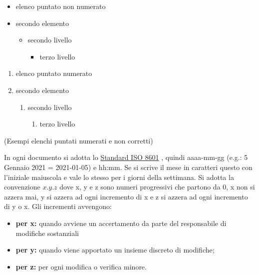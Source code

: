                 \begin{multicols}{2}
                    \begin{itemize}
                        \item elenco puntato non numerato
                        \item secondo elemento
                        \begin{itemize}
                            \item secondo livello
                            \begin{itemize}
                                \item terzo livello
                            \end{itemize}
                        \end{itemize}
                    \end{itemize}
                    \begin{enumerate}
                        \item elenco puntato numerato
                        \item secondo elemento
                        \begin{enumerate}
                            \item secondo livello
                            \begin{enumerate}
                                \item terzo livello
                            \end{enumerate}
                        \end{enumerate}
                    \end{enumerate}
                \end{multicols}
                \centerline{(Esempi elenchi puntati numerati e non corretti)}
                In ogni documento si adotta lo \href{https://www.iso.org/iso-8601-date-and-time-format.html}{Standard ISO 8601} , quindi aaaa-mm-gg (e.g.: 5 Gennaio 2021 = 2021-01-05) e hh:mm. Se si scrive il mese in caratteri questo con l'iniziale maiuscola e vale lo stesso per i giorni della settimana.
                Si adotta la convenzione $x.y.z$ dove x, y e z sono numeri progressivi che partono da 0, x non si azzera mai, y si azzera ad ogni incremento di x e z si azzera ad ogni incremento di y o x. Gli incrementi avvengono:
                \begin{itemize}
                    \item \textbf{per x: }quando avviene un accertamento da parte del responsabile di modifiche sostanziali
                    \item \textbf{per y: }quando viene apportato un insieme discreto di modifiche;
                    \item \textbf{per z: }per ogni modifica o verifica minore.
                \end{itemize}

